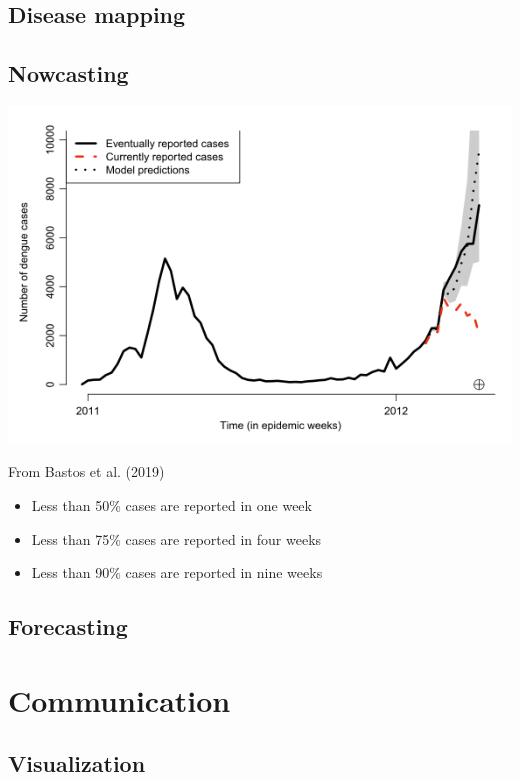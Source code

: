 \documentclass[
  letterpaper,
  DIV=11,
  numbers=noendperiod]{scrreprt}
\providecommand{\tightlist}{%
  \setlength{\itemsep}{0pt}\setlength{\parskip}{0pt}}\usepackage{longtable,booktabs,array}
\begin{document}
\hypertarget{disease-mapping}{%
\chapter{Disease mapping}\label{disease-mapping}}

\hypertarget{nowcasting}{%
\chapter{Nowcasting}\label{nowcasting}}

\includegraphics[width=6.25in,height=\textheight]{img/nowcastingleobastos.png}

From Bastos et al. (2019)

\begin{itemize}
\tightlist
\item
  Less than 50\% cases are reported in one week
\item
  Less than 75\% cases are reported in four weeks
\item
  Less than 90\% cases are reported in nine weeks
\end{itemize}

\hypertarget{forecasting}{%
\chapter{Forecasting}\label{forecasting}}

\part{Communication}

\hypertarget{visualization}{%
\chapter{Visualization}\label{visualization}}
\end{document}
